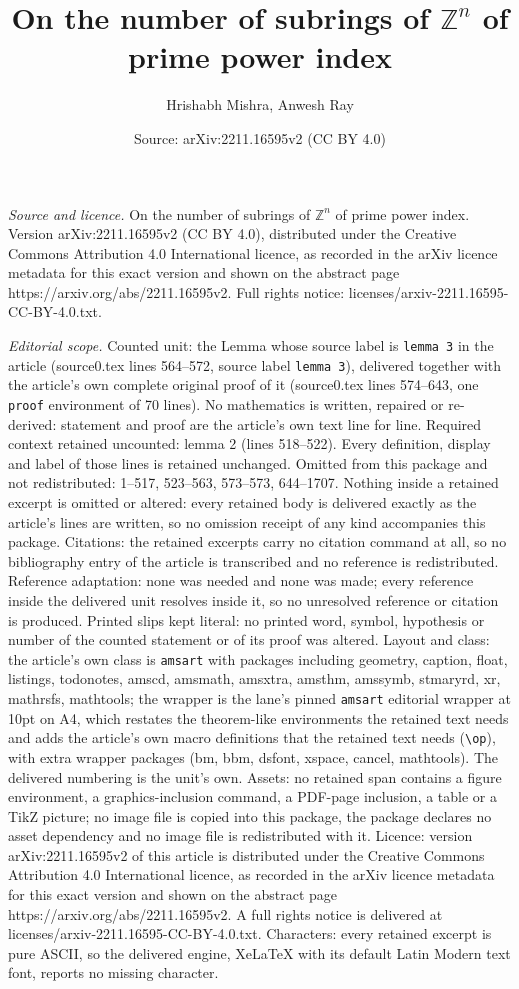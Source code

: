\documentclass[10pt,a4paper]{amsart}
\title[On the number of subrings of $\mathbb{Z}^n$ of prime power i]{On the number of subrings of $\mathbb{Z}^n$ of prime power index}
\author{Hrishabh Mishra, Anwesh Ray}
\date{Source: arXiv:2211.16595v2 (CC BY 4.0)}
\begin{document}
\maketitle

\noindent\emph{Source and licence.} On the number of subrings of $\mathbb{Z}^n$ of prime power index. Version arXiv:2211.16595v2 (CC BY 4.0), distributed under the Creative Commons Attribution 4.0 International licence, as recorded in the arXiv licence metadata for this exact version and shown on the abstract page https://arxiv.org/abs/2211.16595v2. Full rights notice: licenses/arxiv-2211.16595-CC-BY-4.0.txt.\par\smallskip

\noindent\textit{Editorial scope.} Counted unit: the Lemma whose source label is \texttt{lemma 3} in the article (source0.tex lines 564--572, source label \texttt{lemma 3}), delivered together with the article's own complete original proof of it (source0.tex lines 574--643, one \texttt{proof} environment of 70 lines). No mathematics is written, repaired or re-derived: statement and proof are the article's own text line for line. Required context retained uncounted: lemma 2 (lines 518--522). Every definition, display and label of those lines is retained unchanged. Omitted from this package and not redistributed: 1--517, 523--563, 573--573, 644--1707. Nothing inside a retained excerpt is omitted or altered: every retained body is delivered exactly as the article's lines are written, so no omission receipt of any kind accompanies this package. Citations: the retained excerpts carry no citation command at all, so no bibliography entry of the article is transcribed and no reference is redistributed. Reference adaptation: none was needed and none was made; every reference inside the delivered unit resolves inside it, so no unresolved reference or citation is produced. Printed slips kept literal: no printed word, symbol, hypothesis or number of the counted statement or of its proof was altered. Layout and class: the article's own class is \texttt{amsart} with packages including geometry, caption, float, listings, todonotes, amscd, amsmath, amsxtra, amsthm, amssymb, stmaryrd, xr, mathrsfs, mathtools; the wrapper is the lane's pinned \texttt{amsart} editorial wrapper at 10pt on A4, which restates the theorem-like environments the retained text needs and adds the article's own macro definitions that the retained text needs (\texttt{\textbackslash op}), with extra wrapper packages (bm, bbm, dsfont, xspace, cancel, mathtools). The delivered numbering is the unit's own. Assets: no retained span contains a figure environment, a graphics-inclusion command, a PDF-page inclusion, a table or a TikZ picture; no image file is copied into this package, the package declares no asset dependency and no image file is redistributed with it. Licence: version arXiv:2211.16595v2 of this article is distributed under the Creative Commons Attribution 4.0 International licence, as recorded in the arXiv licence metadata for this exact version and shown on the abstract page https://arxiv.org/abs/2211.16595v2. A full rights notice is delivered at licenses/arxiv-2211.16595-CC-BY-4.0.txt. Characters: every retained excerpt is pure ASCII, so the delivered engine, XeLaTeX with its default Latin Modern text font, reports no missing character.
\end{document}
